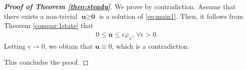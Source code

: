 \documentclass[a4paper,11pt]{amsart}
\theoremstyle{definition}
\def\O{\Omega}
\numberwithin{equation}{section}
\theoremstyle{definition}
\def\O{\Omega}
\begin{document}
\begin{proof}[\bf Proof of Theorem \ref{theo:steady}]
We prove by contradiction. Assume that there exists a non-trivial $\textbf{u}\geq \textbf{0}$ is a solution of \eqref{eq:main1}. Then, it follows from Theorem \ref{compar:1state} that
\begin{align*}
0\leq \textbf{u}\leq \epsilon \varphi_1,~\forall \epsilon>0.
\end{align*}
Letting $\epsilon \rightarrow 0$, we obtain that $\textbf{u} \equiv 0$, which is a contradiction.


 This concludes the proof.


%







\end{proof}
\end{document}
